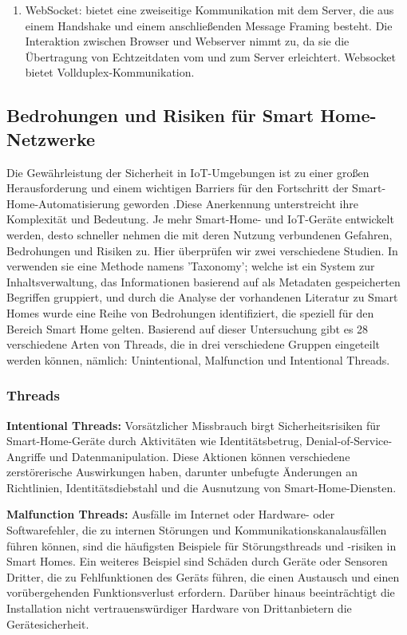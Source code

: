 \begin{enumerate}
    \item WebSocket: bietet eine zweiseitige Kommunikation mit dem Server, die aus einem Handshake und einem anschließenden Message Framing besteht. Die Interaktion zwischen Browser und Webserver nimmt zu, da sie die Übertragung von Echtzeitdaten vom und zum Server erleichtert. Websocket bietet Vollduplex-Kommunikation.\cite{8203943}

\end{enumerate}
\subsection{Bedrohungen und Risiken für Smart Home-Netzwerke}

Die Gewährleistung der Sicherheit in IoT-Umgebungen ist zu einer großen Herausforderung und einem wichtigen Barriers für den Fortschritt der Smart-Home-Automatisierung geworden \cite{10.1145/1978942.1979249} .Diese Anerkennung unterstreicht ihre Komplexität und Bedeutung.
Je mehr Smart-Home- und IoT-Geräte entwickelt werden, desto schneller nehmen die mit deren Nutzung verbundenen Gefahren, Bedrohungen und Risiken zu. Hier überprüfen wir zwei verschiedene Studien. In \cite{8344666} verwenden sie eine Methode namens 'Taxonomy'; welche ist ein System zur Inhaltsverwaltung, das Informationen basierend auf als Metadaten gespeicherten Begriffen gruppiert, und durch die Analyse der vorhandenen Literatur zu Smart Homes wurde eine Reihe von Bedrohungen identifiziert, die speziell für den Bereich Smart Home gelten. Basierend auf dieser Untersuchung gibt es 28 verschiedene Arten von Threads, die in drei verschiedene Gruppen eingeteilt werden können, nämlich: Unintentional, Malfunction und Intentional Threads.

\subsubsection{Threads}

\textbf{Intentional Threads:} 
Vorsätzlicher Missbrauch birgt Sicherheitsrisiken für Smart-Home-Geräte durch Aktivitäten wie Identitätsbetrug, Denial-of-Service-Angriffe und Datenmanipulation. Diese Aktionen können verschiedene zerstörerische Auswirkungen haben, darunter unbefugte Änderungen an Richtlinien, Identitätsdiebstahl und die Ausnutzung von Smart-Home-Diensten.

\textbf{Malfunction Threads:} 
Ausfälle im Internet oder Hardware- oder Softwarefehler, die zu internen Störungen und Kommunikationskanalausfällen führen können, sind die häufigsten Beispiele für Störungsthreads und -risiken in Smart Homes. Ein weiteres Beispiel sind Schäden durch Geräte oder Sensoren Dritter, die zu Fehlfunktionen des Geräts führen, die einen Austausch und einen vorübergehenden Funktionsverlust erfordern. Darüber hinaus beeinträchtigt die Installation nicht vertrauenswürdiger Hardware von Drittanbietern die Gerätesicherheit.

